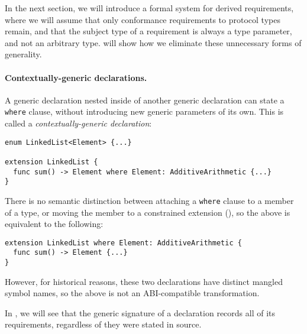 \documentclass[../generics]{subfiles}
\begin{document}
In the next section, we will introduce a formal system for derived requirements, where we will assume that only conformance requirements to protocol types remain, and that the subject type of a requirement is always a type parameter, and not an arbitrary type.  will show how we eliminate these unnecessary forms of generality.

\paragraph{Contextually-generic declarations.} A generic declaration nested inside of another generic declaration can state a \texttt{where} clause, without introducing new generic parameters of its own. This is called a \emph{contextually-generic declaration}:
\begin{Verbatim}
enum LinkedList<Element> {...}

extension LinkedList {
  func sum() -> Element where Element: AdditiveArithmetic {...}
}
\end{Verbatim}
There is no semantic distinction between attaching a \texttt{where} clause to a member of a type, or moving the member to a constrained extension (), so the above is equivalent to the following:
\begin{Verbatim}
extension LinkedList where Element: AdditiveArithmetic {
  func sum() -> Element {...}
}
\end{Verbatim}
However, for historical reasons, these two declarations have distinct mangled symbol names, so the above is not an ABI-compatible transformation.

\medskip

In , we will see that the generic signature of a declaration records all of its requirements, regardless of they were stated in source.
\end{document}
